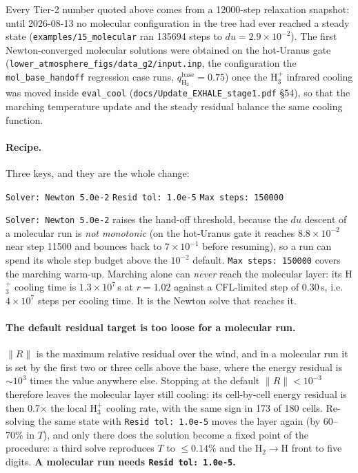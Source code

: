 \documentclass[english,a4paper]{my_memo}
\newcommand{\qHH}{q_{\mathrm{H_2}}}
\begin{document}
Every Tier-2 number quoted above comes from a 12000-step relaxation snapshot:
until 2026-08-13 no molecular configuration in the tree had ever reached a steady
state (\texttt{examples/15\_molecular} ran 135694 steps to $du=2.9\times10^{-2}$).
The first Newton-converged molecular solutions were obtained on the hot-Uranus
gate (\texttt{lower\_atmosphere\_figs/data\_g2/input.inp}, the configuration the
\texttt{mol\_base\_handoff} regression case runs, $\qHH^\mathrm{base}=0.75$) once
the H$_3^+$ infrared cooling was moved inside \texttt{eval\_cool}
(\texttt{docs/Update\_EXHALE\_stage1.pdf} \S54), so that the marching temperature update
and the steady residual balance the same cooling function.

\paragraph{Recipe.} Three keys, and they are the whole change:
\begin{center}
\texttt{Solver: Newton 5.0e-2} \quad
\texttt{Resid tol: 1.0e-5} \quad
\texttt{Max steps: 150000}
\end{center}
\texttt{Solver: Newton 5.0e-2} raises the hand-off threshold, because the $du$
descent of a molecular run is \emph{not monotonic} (on the hot-Uranus gate it
reaches $8.8\times10^{-2}$ near step 11500 and bounces back to $7\times10^{-1}$
before resuming), so a run can spend its whole step budget above the
$10^{-2}$ default. \texttt{Max steps: 150000} covers the marching warm-up.
Marching alone can \emph{never} reach the molecular layer: its H$_3^+$ cooling
time is $1.3\times10^{7}$\,s at $r=1.02$ against a CFL-limited step of 0.30\,s,
i.e.\ $4\times10^{7}$ steps per cooling time. It is the Newton solve that
reaches it.

\paragraph{The default residual target is too loose for a molecular run.}
$\|R\|$ is the maximum relative residual over the wind, and in a molecular run it
is set by the first two or three cells above the base, where the energy residual
is ${\sim}10^{3}$ times the value anywhere else. Stopping at the default
$\|R\|<10^{-3}$ therefore leaves the molecular layer still cooling: its
cell-by-cell energy residual is then 0.7$\times$ the local H$_3^+$ cooling rate,
with the same sign in 173 of 180 cells. Re-solving the same state with
\texttt{Resid tol: 1.0e-5} moves the layer again (by 60--70\% in $T$), and
only there does the solution become a fixed point of the procedure: a third solve
reproduces $T$ to $\le0.14\%$ and the H$_2\to$H front to five digits.
\textbf{A molecular run needs \texttt{Resid tol: 1.0e-5}.}
\end{document}
